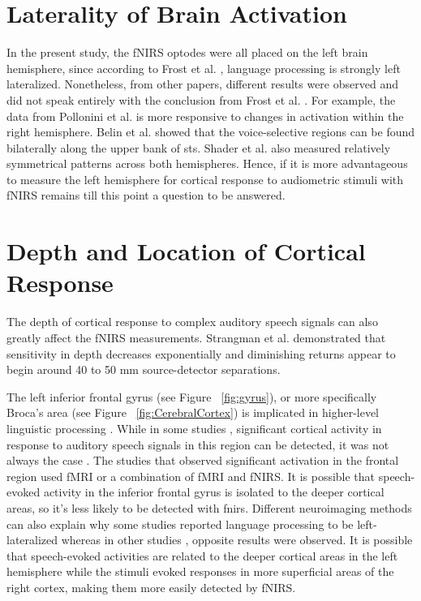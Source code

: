 \section{Laterality of Brain Activation}
In the present study, the fNIRS optodes were all placed on the left brain hemisphere, since according to Frost et al. \citeyearpar{Frost1999-vs}, language processing is strongly left lateralized. Nonetheless, from other papers, different results were observed and did not speak entirely with the conclusion from Frost et al. \citeyearpar{Frost1999-vs}. For example, the data from Pollonini et al. \citeyearpar{Pollonini2013} is more responsive to changes in activation within the right hemisphere. Belin et al. \citeyearpar{Belin2000} showed that the voice-selective regions can be found bilaterally along the upper bank of \acrshort{sts}. Shader et al. \citep{Shader2021} also measured relatively symmetrical patterns across both hemispheres. Hence, if it is more advantageous to measure the left hemisphere for cortical response to audiometric stimuli with fNIRS remains till this point a question to be answered.

\section{Depth and Location of Cortical Response} %
The depth of cortical response to complex auditory speech signals can also greatly affect the fNIRS measurements. Strangman et al. \citeyearpar{Strangman2013} demonstrated that sensitivity in depth decreases exponentially and diminishing returns appear to begin around 40 to 50 mm source-detector separations.

The left inferior frontal gyrus (see Figure ~\ref{fig:gyrus}), or more specifically Broca's area (see Figure ~\ref{fig:CerebralCortex}) is implicated in higher-level linguistic processing \citep{Belin2000}. While in some studies \citep{Wijayasir2017} \citep{Zhou2018}, significant cortical activity in response to auditory speech signals in this region can be detected, it was not always the case \citep{Musthtaq2019}. The studies that observed significant activation in the frontal region used fMRI or a combination of fMRI and fNIRS. It is possible that speech-evoked activity in the inferior frontal gyrus is isolated to the deeper cortical areas, so it's less likely to be detected with \acrshort{fnirs}. Different neuroimaging methods can also explain why some studies \citep{Frost1999-vs} reported language processing to be left-lateralized whereas in other studies \citep{Shader2021}, opposite results were observed. It is possible that speech-evoked activities are related to the deeper cortical areas in the left hemisphere while the stimuli evoked responses in more superficial areas of the right cortex, making them more easily detected by fNIRS.


